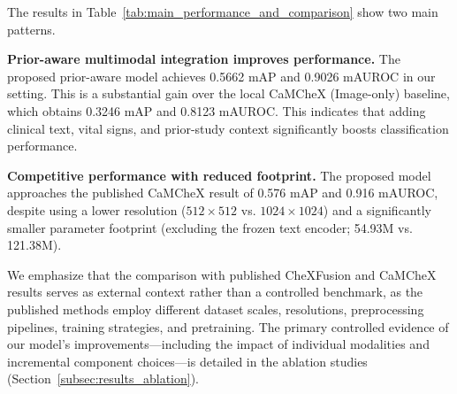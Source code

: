 \begin{table}[H]
    \centering
    \caption{Main performance and comparison with reference methods on the CXR-LT-2023 dataset.}
    \label{tab:main_performance_and_comparison}
\end{table}

The results in Table~\ref{tab:main_performance_and_comparison} show two main patterns.

\textbf{Prior-aware multimodal integration improves performance.} The proposed prior-aware model achieves 0.5662 mAP and 0.9026 mAUROC in our setting. This is a substantial gain over the local CaMCheX (Image-only) baseline, which obtains 0.3246 mAP and 0.8123 mAUROC. This indicates that adding clinical text, vital signs, and prior-study context significantly boosts classification performance.

\textbf{Competitive performance with reduced footprint.} The proposed model approaches the published CaMCheX result of 0.576 mAP and 0.916 mAUROC, despite using a lower resolution ($512 \times 512$ vs. $1024 \times 1024$) and a significantly smaller parameter footprint (excluding the frozen text encoder; 54.93M vs. 121.38M). 

We emphasize that the comparison with published CheXFusion and CaMCheX results serves as external context rather than a controlled benchmark, as the published methods employ different dataset scales, resolutions, preprocessing pipelines, training strategies, and pretraining. The primary controlled evidence of our model's improvements—including the impact of individual modalities and incremental component choices—is detailed in the ablation studies (Section~\ref{subsec:results_ablation}).

